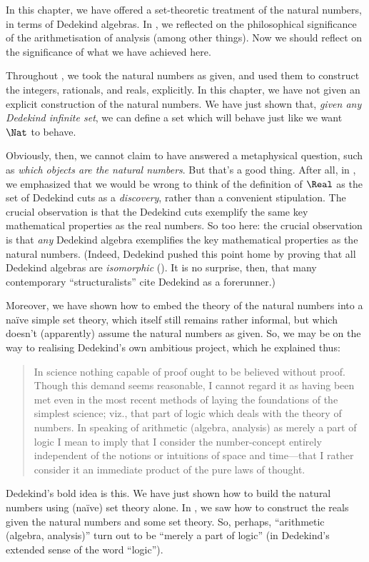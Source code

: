 \documentclass[../../../include/open-logic-section]{subfiles}
\begin{document}


In this chapter, we have offered a set-theoretic treatment of the
natural numbers, in terms of Dedekind algebras. In
, we reflected on the philosophical
significance of the arithmetisation of analysis (among other things).
Now we should reflect on the significance of what we have achieved
here.

Throughout , we took the natural numbers as
given, and used them to construct the integers, rationals, and reals,
explicitly. In this chapter, we have not given an explicit
construction of the natural numbers. We have just shown that,
\emph{given any Dedekind infinite set}, we can define a set which will
behave just like we want~$\Nat$ to behave. 

Obviously, then, we cannot claim to have answered a metaphysical
question, such as \emph{which objects are the natural numbers}. But
that's a good thing. After all, in  , we
emphasized that we would be wrong to think of the definition of
$\Real$ as the set of Dedekind cuts as a \emph{discovery}, rather than
a convenient stipulation. The crucial observation is that the Dedekind
cuts exemplify the same key mathematical properties as the real
numbers. So too here: the crucial observation is that \emph{any}
Dedekind algebra exemplifies the key mathematical properties as the
natural numbers. (Indeed, Dedekind pushed this point home by proving
that all Dedekind algebras are \emph{isomorphic} (\citeyear[Theorems
132--3]{Dedekind1888}). It is no surprise, then, that many
contemporary ``structuralists'' cite Dedekind as a forerunner.)

 Moreover, we have shown how to embed the theory of the natural
 numbers into a na\"ive simple set theory, which itself still remains
 rather informal, but which doesn't (apparently) assume the natural
 numbers as given. So, we may be on the way to realising Dedekind's
 own ambitious project, which he explained thus:
\begin{quote}
	In science nothing capable of proof ought to be believed without
	proof. Though this demand seems reasonable, I cannot regard it as
	having been met even in the most recent methods of laying the
	foundations of the simplest science; viz., that part of logic
	which deals with the theory of numbers. In speaking of arithmetic
	(algebra, analysis) as merely a part of logic I mean to imply that
	I consider the number-concept entirely independent of the notions
	or intuitions of space and time---that I rather consider it an
	immediate product of the pure laws of thought.
	\citep[preface]{Dedekind1888}
\end{quote}
Dedekind's bold idea is this. We have just shown how to build the
natural numbers using (na\"ive) set theory alone. In
, we saw how to construct the reals given
the natural numbers and some set theory. So, perhaps, ``arithmetic
(algebra, analysis)'' turn out to be ``merely a part of logic'' (in
Dedekind's extended sense of the word ``logic'').
\end{document}

